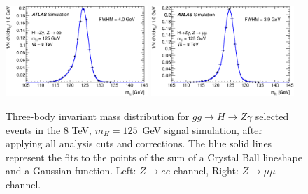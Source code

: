 \begin{figure}[!htbp]
  \begin{center}
{\includegraphics[width=0.48\textwidth]{figures/PlotsSuperposedResolutionCorrections_e_mc12a_Mllg}}
{\includegraphics[width=0.48\textwidth]{figures/PlotsSuperposedResolutionCorrections_mu_mc12a_Mllg}}
\caption{Three-body invariant mass distribution for $gg\to H\to Z\gamma$
    selected events in the 8 TeV, $m_H=125$~GeV signal simulation, 
    after applying all analysis cuts and corrections. The blue solid lines 
    represent the fits to the points of the sum of a 
    Crystal Ball lineshape and a Gaussian function.
    Left: $Z\to ee$ channel, Right: $Z\to\mu\mu$ channel.}
  \label{fig:signal_resolution_corrections}
  \end{center}
\end{figure}

